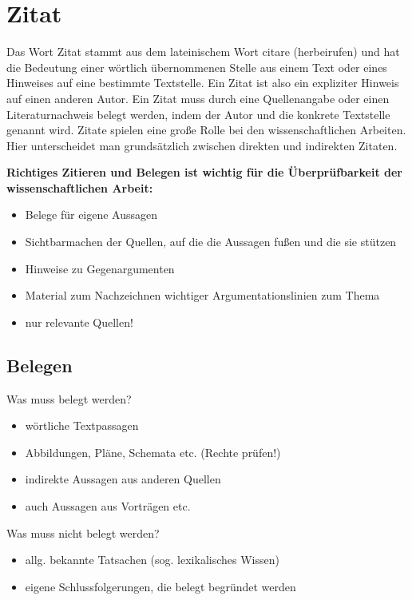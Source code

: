 \documentclass[ 12pt,
                titlepage,
                parskip=half,
                version=first,
                bibliography=totocnumbered,
                final,
                listof=totoc]{scrartcl}
\begin{document}
\section{Zitat}
\label{sec:zitat}

Das Wort Zitat stammt aus dem lateinischem Wort citare (herbeirufen) und hat die
Bedeutung einer wörtlich übernommenen Stelle aus einem Text oder eines Hinweises
auf eine bestimmte Textstelle. Ein Zitat ist also ein expliziter Hinweis auf
einen anderen Autor. Ein Zitat muss durch eine Quellenangabe oder einen
Literaturnachweis belegt werden, indem der Autor und die konkrete Textstelle
genannt wird. Zitate spielen eine große Rolle bei den wissenschaftlichen
Arbeiten. Hier unterscheidet man grundsätzlich zwischen direkten und indirekten
Zitaten.

\textbf{Richtiges Zitieren und Belegen ist wichtig für die Überprüfbarkeit der
wissenschaftlichen Arbeit:}

\begin{itemize}
    \item Belege für eigene Aussagen
    \item Sichtbarmachen der Quellen, auf die die Aussagen fußen und die sie
    stützen
    \item Hinweise zu Gegenargumenten
    \item Material zum Nachzeichnen wichtiger Argumentationslinien zum Thema
    \item nur relevante Quellen!
\end{itemize}

\subsection{Belegen}
\label{sec:belegen}

\begin{description}
    \item[Was muss belegt werden?]
\end{description}
\begin{itemize}
    \item wörtliche Textpassagen
    \item Abbildungen, Pläne, Schemata etc. (Rechte prüfen!)
    \item indirekte Aussagen aus anderen Quellen
    \item auch Aussagen aus Vorträgen etc.
\end{itemize}

\begin{samepage}
\begin{description}
    \item[Was muss nicht belegt werden?]
\end{description}
\begin{itemize}
    \item allg. bekannte Tatsachen (sog. lexikalisches Wissen)
    \item eigene Schlussfolgerungen, die belegt begründet werden
\end{itemize}
\end{samepage}
\end{document}
